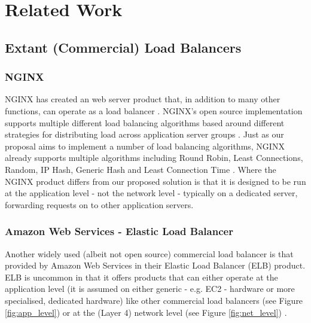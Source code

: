 \section{Related Work} \label{sec:related_work}
\subsection{Extant (Commercial) Load Balancers}

\subsubsection{NGINX}
NGINX has created an web server product that, in addition to many other functions, can operate as a load balancer \cite{nginxPlus}. NGINX's open source implementation supports multiple different load balancing algorithms based around different strategies for distributing load across application server groups \cite{nginxPlus}. Just as our proposal aims to implement a number of load balancing algorithms, NGINX already supports multiple algorithms including Round Robin, Least Connections, Random, IP Hash, Generic Hash and Least Connection Time \cite{nginxPlus}. Where the NGINX product differs from our proposed solution is that it is designed to be run at the application level - not the network level - typically on a dedicated server, forwarding requests on to other application servers.

\subsubsection{Amazon Web Services - Elastic Load Balancer}
Another widely used (albeit not open source) commercial load balancer is that provided by Amazon Web Services in their Elastic Load Balancer (ELB) product. ELB is uncommon in that it offers products that can either operate at the application level (it is assumed on either generic - e.g. EC2 - hardware or more specialised, dedicated hardware) like other commercial load balancers (see Figure \ref{fig:app_level}) or at the (Layer 4) network level (see Figure \ref{fig:net_level}) \cite{awsALB}. 

